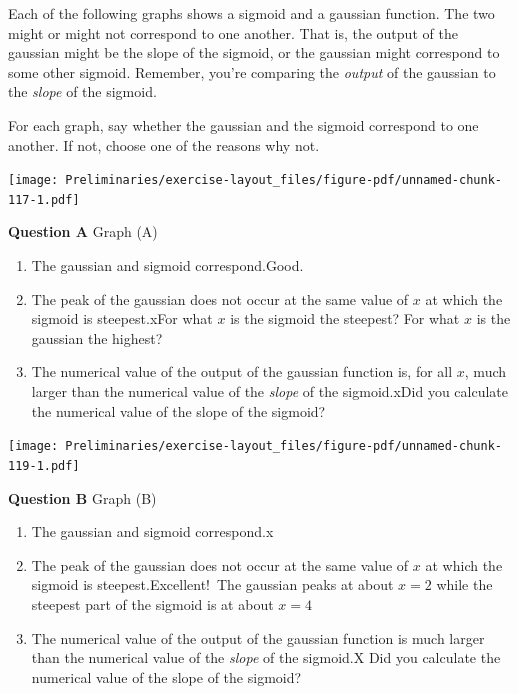 \documentclass[
  letterpaper,
  DIV=11,
  numbers=noendperiod,
  oneside]{article}
\providecommand{\tightlist}{%
  \setlength{\itemsep}{0pt}\setlength{\parskip}{0pt}}\usepackage{longtable,booktabs,array}
\begin{document}
\begin{multicols}{2}
Each of the following graphs shows a sigmoid and a gaussian function.
The two might or might not correspond to one another. That is, the
output of the gaussian might be the slope of the sigmoid, or the
gaussian might correspond to some other sigmoid. Remember, you're
comparing the \emph{output} of the gaussian to the \emph{slope} of the
sigmoid.

For each graph, say whether the gaussian and the sigmoid correspond to
one another. If not, choose one of the reasons why not.

\texttt{[image: Preliminaries/exercise-layout\_files/figure-pdf/unnamed-chunk-117-1.pdf]}

\textbf{Question A} Graph (A)

\begin{enumerate}
\def\labelenumi{\roman{enumi}.}
\tightlist
\item
  {The gaussian and sigmoid correspond.{Good.~}}\\
\item
  {The peak of the gaussian does not occur at the same value of \(x\) at
  which the sigmoid is steepest.{xFor what \(x\) is the sigmoid the
  steepest? For what \(x\) is the gaussian the highest?}}\\
\item
  {The numerical value of the output of the gaussian function is, for
  all \(x\), much larger than the numerical value of the \emph{slope} of
  the sigmoid.{xDid you calculate the numerical value of the slope of
  the sigmoid?}}
\end{enumerate}

\texttt{[image: Preliminaries/exercise-layout\_files/figure-pdf/unnamed-chunk-119-1.pdf]}

\textbf{Question B} Graph (B)

\begin{enumerate}
\def\labelenumi{\roman{enumi}.}
\tightlist
\item
  {The gaussian and sigmoid correspond.{x}}\\
\item
  {The peak of the gaussian does not occur at the same value of \(x\) at
  which the sigmoid is steepest.{Excellent!~The gaussian peaks at about
  \(x=2\) while the steepest part of the sigmoid is at about \(x=4\)}}\\
\item
  {The numerical value of the output of the gaussian function is much
  larger than the numerical value of the \emph{slope} of the sigmoid.{︎X
  Did you calculate the numerical value of the slope of the sigmoid?}}
\end{enumerate}


\end{multicols}
\end{document}
